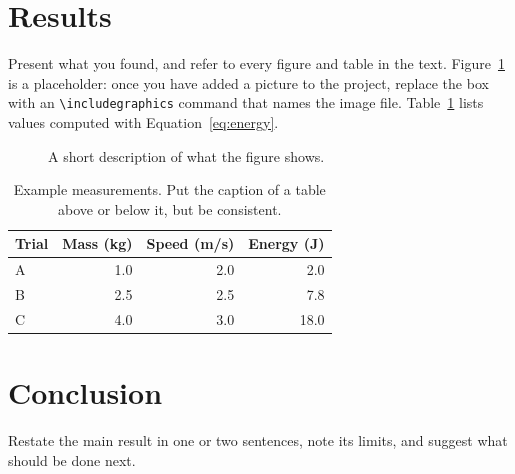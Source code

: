 \documentclass[11pt]{article}
\begin{document}
\section{Results}
\label{sec:results}

Present what you found, and refer to every figure and table in the text.
Figure~\ref{fig:overview} is a placeholder: once you have added a picture
to the project, replace the box with an \texttt{\textbackslash includegraphics} command
that names the image file. Table~\ref{tab:results} lists values
computed with Equation~\eqref{eq:energy}.

\begin{figure}[t]
  \centering
  \caption{A short description of what the figure shows.}
  \label{fig:overview}
\end{figure}

\begin{table}[t]
  \centering
  \begin{tabular}{lrrr}
    \toprule
    Trial & Mass (kg) & Speed (m/s) & Energy (J) \\
    \midrule
    A & 1.0 & 2.0 & 2.0 \\
    B & 2.5 & 2.5 & 7.8 \\
    C & 4.0 & 3.0 & 18.0 \\
    \bottomrule
  \end{tabular}
  \caption{Example measurements. Put the caption of a table above or below it, but be consistent.}
  \label{tab:results}
\end{table}

\section{Conclusion}
\label{sec:conclusion}

Restate the main result in one or two sentences, note its limits, and
suggest what should be done next.



\end{document}
